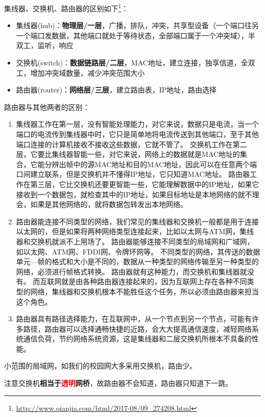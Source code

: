 
集线器、交换机、路由器的区别如下\footnote{\url{http://www.qianjia.com/html/2017-08/09_274208.html}}：
\begin{itemize}
	\item 集线器(hub)：\textbf{物理层/一层}，广播，排队，冲突，共享型设备（一个端口往另一个端口发数据，其他端口就处于等待状态，全部端口属于一个冲突域），半双工，监听，响应
	\item 交换机(switch)：\textbf{数据链路层/二层}，MAC地址，建立连接，独享信道，全双工，增加冲突域数量，减少冲突范围大小
	\item 路由器(router)：\textbf{网络层/三层}，建立路由表，IP地址，路由选择
\end{itemize}

路由器与其他两者的区别：
\begin{enumerate}
\item 集线器工作在第一层，没有智能处理能力，对它来说，数据只是电流，当一个端口的电流传到集线器中时，它只是简单地将电流传送到其他端口，至于其他端口连接的计算机接收不接收这些数据，它就不管了。
交换机工作在第二层，它要比集线器智能一些，对它来说，网络上的数据就是MAC地址的集合，它能分辨出帧中的源MAC地址和目的MAC地址，因此可以在任意两个端口间建立联系，但是交换机并不懂得IP地址，它只知道MAC地址。
路由器工作在第三层，它比交换机还要更智能一些，它能理解数据中的IP地址，如果它接收到一个数据包，就检查其中的IP地址，如果目标地址是本地网络的就不理会，如果是其他网络的，就将数据包转发出本地网络。

\item 路由器能连接不同类型的网络，我们常见的集线器和交换机一般都是用于连接以太网的，但是如果将两种网络类型连接起来，比如以太网与ATM网，集线器和交换机就派不上用场了。
路由器能够连接不同类型的局域网和广域网，如以太网、ATM网、FDDI网、令牌环网等。
不同类型的网络，其传送的数据单元---帧的格式和大小是不同的，数据从一种类型的网络传输至另一种类型的网络，必须进行帧格式转换。
路由器就有这种能力，而交换机和集线器就没有。
而互联网就是由各种路由器连接起来的，因为互联网上存在各种不同类型的网络，集线器和交换机根本不能胜任这个任务，所以必须由路由器来担当这个角色。

\item 路由器具有路径选择能力，在互联网中，从一个节点到另一个节点，可能有许多路径，路由器可以选择通畅快捷的近路，会大大提高通信速度，减轻网络系统通信负荷，节约网络系统资源，这是集线器和二层交换机所根本不具备的性能。
\end{enumerate}

小范围的局域网，如我们的校园网大多采用交换机，路由少。

注意交换机\textbf{相当于\textcolor{red}{透明}网桥}，故路由器不会知道，路由器只知道下一跳。